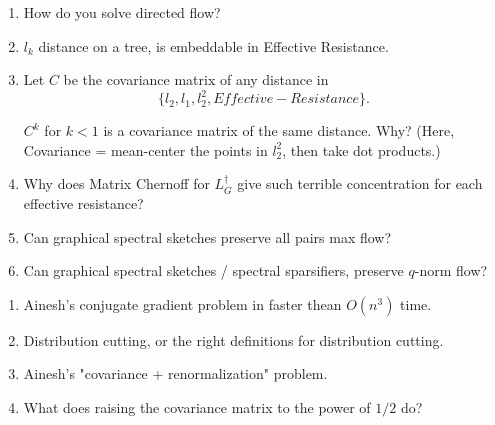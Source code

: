\documentclass[12pt]{article}
\begin{document}
\begin{enumerate}
\item How do you solve directed flow?
\item $l_k$ distance on a tree, is embeddable in Effective Resistance.
\item Let $C$ be the covariance matrix of any distance in 
\[ \{l_2, l_1, l_2^2, Effective-Resistance\}. \]

$C^k$ for $k < 1$ is a covariance matrix of the same distance.
Why?  (Here, Covariance = mean-center the points in $l_2^2$, then
    take dot products.)
\item Why does Matrix Chernoff for $L_G^\dag$ give such terrible
concentration for each effective resistance?
\item Can graphical spectral sketches preserve all pairs max flow?
\item Can graphical spectral sketches / spectral sparsifiers, preserve
$q$-norm flow?
\end{enumerate}

\begin{enumerate}
\item Ainesh's conjugate gradient problem in faster thean
$O(n^3)$ time.
\item Distribution cutting, or the right definitions for
distribution cutting.
\item Ainesh's "covariance + renormalization" problem.
\item What does raising the covariance matrix to the power of
$1/2$ do?
\end{enumerate}
\end{document}
